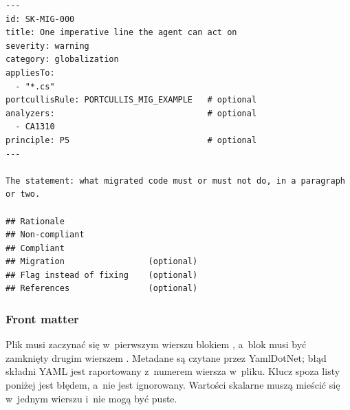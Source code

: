 \begin{lstlisting}
---
id: SK-MIG-000
title: One imperative line the agent can act on
severity: warning
category: globalization
appliesTo:
  - "*.cs"
portcullisRule: PORTCULLIS_MIG_EXAMPLE   # optional
analyzers:                               # optional
  - CA1310
principle: P5                            # optional
---

The statement: what migrated code must or must not do, in a paragraph or two.

## Rationale
## Non-compliant
## Compliant
## Migration                 (optional)
## Flag instead of fixing    (optional)
## References                (optional)
\end{lstlisting}

\subsubsection{Front matter}

Plik musi zaczynać się w~pierwszym wierszu blokiem \repopath{-{}-{}-}, a~blok musi być
zamknięty drugim wierszem \repopath{-{}-{}-}. Metadane są czytane przez YamlDotNet; błąd składni
YAML jest raportowany z~numerem wiersza w~pliku. Klucz spoza listy poniżej jest błędem, a~nie
jest ignorowany. Wartości skalarne muszą mieścić się w~jednym wierszu i~nie mogą być puste.


